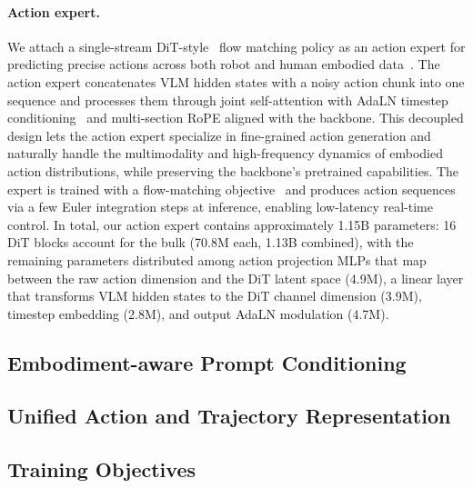 \documentclass{article}
\begin{document}
\paragraph{Action expert.}
We attach a single-stream DiT-style~\citep{esser2024scaling} flow matching policy as an action expert for predicting precise actions across both robot and human embodied data~\citep{janner2022planning,chi2023diffusion,adaptdiffuser,black2024pi0}.
The action expert concatenates VLM hidden states with a noisy action chunk into one sequence and processes them through joint self-attention with AdaLN timestep
conditioning~\citep{peebles2023scalable} and multi-section RoPE aligned with the backbone.
This decoupled design lets the action expert specialize in fine-grained action generation and naturally handle the multimodality and high-frequency dynamics of
embodied action distributions, while preserving the backbone's pretrained capabilities.
The expert is trained with a flow-matching objective~\citep{lipman2023flow} and produces action sequences via a few Euler integration steps at inference,
enabling low-latency real-time control.
In total, our action expert contains approximately 1.15B parameters: 16 DiT blocks account for the bulk (70.8M each, 1.13B combined), with the remaining parameters distributed among action projection MLPs that
map between the raw action dimension and the DiT latent space (4.9M), a linear layer that transforms VLM hidden states to the DiT channel dimension (3.9M), timestep embedding (2.8M), and output AdaLN modulation
(4.7M).



\subsection{Embodiment-aware Prompt Conditioning}
\label{sec:Prompt-formulation}


\subsection{Unified Action and Trajectory Representation}
\label{sec:unified-representation}


\subsection{Training Objectives}

\end{document}

